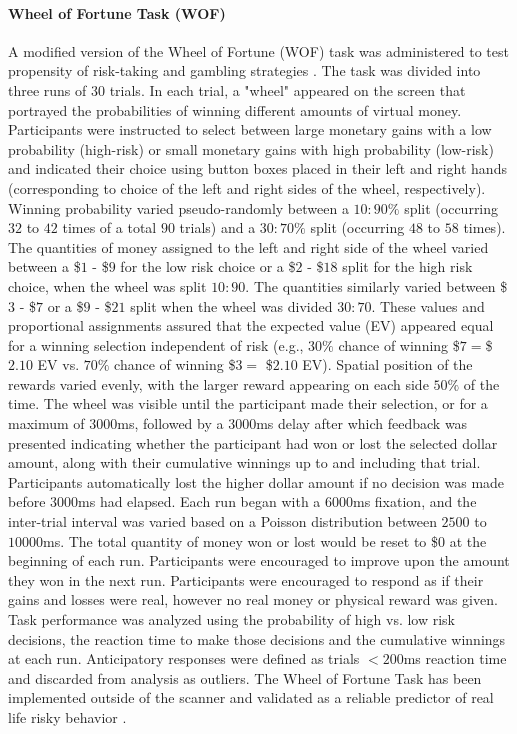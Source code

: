 \documentclass{article}%
\begin{document}
\paragraph*{Wheel of Fortune Task (WOF)} A modified version of the Wheel of Fortune (WOF) task was administered to test propensity of risk-taking and gambling strategies \citep{ernst2004wheeloffortune}. The task was divided into three runs of 30 trials. In each trial, a "wheel" appeared on the screen that portrayed the probabilities of winning different amounts of virtual money. Participants were instructed to select between large monetary gains with a low probability (high-risk) or small monetary gains with high probability (low-risk) and indicated their choice using button boxes placed in their left and right hands (corresponding to choice of the left and right sides of the wheel, respectively). Winning probability varied pseudo-randomly between a $10:90\%$ split (occurring $32$ to $42$ times of a total $90$ trials) and a $30:70\%$ split (occurring $48$ to $58$ times). The quantities of money assigned to the left and right side of the wheel varied between a \$$1$ - \$$9$ for the low risk choice or a \$$2$ - \$$18$ split for the high risk choice, when the wheel was split $10:90$. The quantities similarly varied between \$$3$ - \$$7$ or a \$$9$ - \$$21$ split when the wheel was divided $30:70$.  These values and proportional assignments assured that the expected value (EV) appeared equal for a winning selection independent of risk (e.g., $30\%$ chance of winning \$$7 = $\$$2.10$ EV vs. $70\%$ chance of winning \$$3 =$ \$$2.10$ EV).  Spatial position of the rewards varied evenly, with the larger reward appearing on each side $50\%$ of the time.  The wheel was visible until the participant made their selection, or for a maximum of $3000$ms, followed by a $3000$ms delay after which feedback was presented indicating whether the participant had won or lost the selected dollar amount, along with their cumulative winnings up to and including that trial.  Participants automatically lost the higher dollar amount if no decision was made before $3000$ms had elapsed.  Each run began with a $6000$ms fixation, and the inter-trial interval was varied based on a Poisson distribution between $2500$ to $10000$ms. The total quantity of money won or lost would be reset to \$$0$ at the beginning of each run. Participants were encouraged to improve upon the amount they won in the next run.  Participants were encouraged to respond as if their gains and losses were real, however no real money or physical reward was given. Task performance was analyzed using the probability of high vs. low risk decisions, the reaction time to make those decisions and the cumulative winnings at each run. Anticipatory responses were defined as trials $<200$ms reaction time and discarded from analysis as outliers. The Wheel of Fortune Task has been implemented outside of the scanner and validated as a reliable predictor of real life risky behavior \cite{rao2011relationship}.
\end{document}
